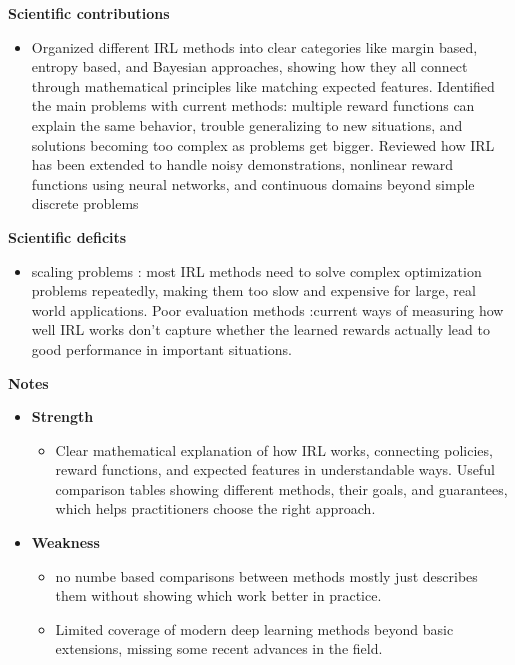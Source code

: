 \documentclass[report.tex]{subfiles}
\begin{document}
\noindent\textbf{Scientific contributions} 
\begin{itemize}
        \item   Organized different IRL methods into clear categories like margin based, entropy based, and Bayesian approaches, showing how they all connect through mathematical principles like matching expected features. Identified the main problems with current methods: multiple reward functions can explain the same behavior, trouble generalizing to new situations, and solutions becoming too complex as problems get bigger. Reviewed how IRL has been extended to handle noisy demonstrations, nonlinear reward functions using neural networks, and continuous domains beyond simple discrete problems
        
\end{itemize}

\noindent\textbf{Scientific deficits} 
\begin{itemize}
        \item   scaling problems  : most IRL methods need to solve complex optimization problems repeatedly, making them too slow and expensive for large, real world applications. Poor evaluation methods :current ways of measuring how well IRL works don't capture whether the learned rewards actually lead to good performance in important situations. 
        
       
\end{itemize}

\noindent\textbf{Notes}
\begin{itemize}
    \item \noindent\textbf {Strength}
    \begin{itemize}
        \item Clear mathematical explanation of how IRL works, connecting policies, reward functions, and expected features in understandable ways. Useful comparison tables showing different methods, their goals, and guarantees, which helps practitioners choose the right approach. 
        
       
    \end{itemize}
    
    \item \noindent\textbf{Weakness}
    \begin{itemize}
        \item no numbe based comparisons between methods  mostly just describes them without showing which work better in practice.
        \item Limited coverage of modern deep learning methods beyond basic extensions, missing some recent advances in the field. 
    \end{itemize}
\end{itemize}
\end{document}

